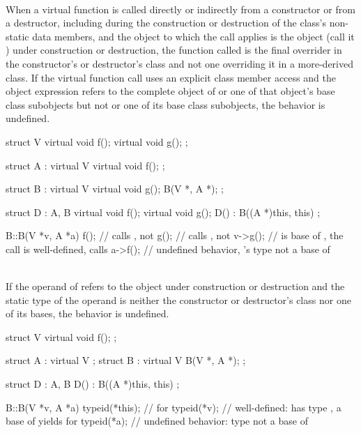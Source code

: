 \pnum
{} \\
When a virtual function is called directly or indirectly from a constructor or from a destructor,
including during the construction or destruction of the class's non-static data members, and the object to
which the call applies is the object (call it ) under construction or destruction, the function called is the
final overrider in the constructor's or destructor's class and not one overriding it in a more-derived class.
If the virtual function call uses an explicit class member access  and the object expression refers
to the complete object of  or one of that object's base class subobjects but not  or one of its base class
subobjects, the behavior is undefined.

\pnum
\begin{example}
\begin{codeblock}
struct V {
  virtual void f();
  virtual void g();
};

struct A : virtual V {
  virtual void f();
};

struct B : virtual V {
  virtual void g();
  B(V *, A *);
};

struct D : A, B {
  virtual void f();
  virtual void g();
  D() : B((A *)this, this) {}
};

B::B(V *v, A *a) {
  f();          // calls , not 
  g();          // calls , not 
  v->g();       //  is base of , the call is well-defined, calls 
  a->f();       // undefined behavior, 's type not a base of 
}
\end{codeblock}
\end{example}


\pnum
{} \\
If the operand of  refers to
the object under construction or destruction and the static type of the operand is neither the constructor or
destructor's class nor one of its bases, the behavior is undefined.

\pnum
\begin{example}
\begin{codeblock}
struct V {
  virtual void f();
};

struct A : virtual V {};
struct B : virtual V {
  B(V *, A *);
};

struct D : A, B {
  D() : B((A *)this, this) {}
};

B::B(V *v, A *a) {
  typeid(*this);        //  for 
  typeid(*v);           // well-defined:  has type , a base of  yields  for 
  typeid(*a);           // undefined behavior: type  not a base of 
}
\end{codeblock}
\end{example}


